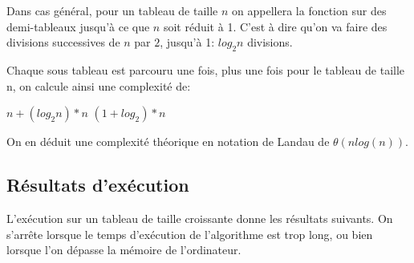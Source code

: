 \documentclass[a4paper, 12pt]{article}
\begin{document}
Dans cas général, pour un tableau de taille $n$ on appellera la fonction sur des demi-tableaux jusqu'à ce que $n$ soit réduit à 1. C'est à dire qu'on va faire des divisions successives de $n$ par $2$, jusqu'à 1: 
$log _2  n$ divisions. 

Chaque sous tableau est parcouru une fois, plus une fois pour le tableau de taille n, on calcule ainsi une complexité de:

$n + (log _2 n)*n $
$(1 + log _2)*n $

On en déduit une complexité théorique en notation de Landau de $\theta(nlog(n))$.
\subsection{Résultats d’exécution}
L'exécution sur un tableau de taille croissante donne les résultats suivants. On s'arrête lorsque le temps d'exécution de l'algorithme est trop long, ou bien lorsque l'on dépasse la mémoire de l'ordinateur.
\end{document}
